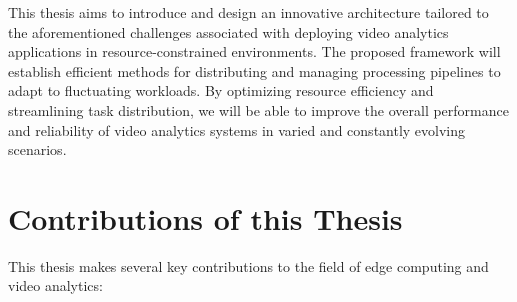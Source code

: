 

This thesis aims to introduce and design an innovative architecture tailored to the aforementioned challenges associated with deploying video analytics applications in resource-constrained environments. The proposed framework will establish efficient methods for distributing and managing processing pipelines to adapt to fluctuating workloads. By optimizing resource efficiency and streamlining task distribution, we will be able to improve the overall performance and reliability of video analytics systems in varied and constantly evolving scenarios.

\section{Contributions of this Thesis}

This thesis makes several key contributions to the field of edge computing and video analytics:

